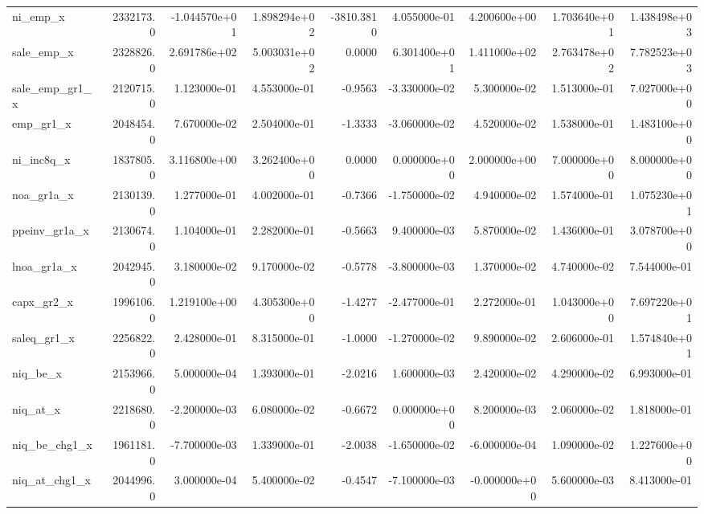 \documentclass[10pt]{article}
\begin{document}
\begin{landscape}
\begin{longtable}{|l|r|r|r|r|r|r|r|r|}
ni\_emp\_x                &  2332173.0 & -1.044570e+01 &  1.898294e+02 &  -3810.3810 &  4.055000e-01 &  4.200600e+00 &  1.703640e+01 &  1.438498e+03 \\
sale\_emp\_x              &  2328826.0 &  2.691786e+02 &  5.003031e+02 &      0.0000 &  6.301400e+01 &  1.411000e+02 &  2.763478e+02 &  7.782523e+03 \\
sale\_emp\_gr1\_x          &  2120715.0 &  1.123000e-01 &  4.553000e-01 &     -0.9563 & -3.330000e-02 &  5.300000e-02 &  1.513000e-01 &  7.027000e+00 \\
emp\_gr1\_x               &  2048454.0 &  7.670000e-02 &  2.504000e-01 &     -1.3333 & -3.060000e-02 &  4.520000e-02 &  1.538000e-01 &  1.483100e+00 \\
ni\_inc8q\_x              &  1837805.0 &  3.116800e+00 &  3.262400e+00 &      0.0000 &  0.000000e+00 &  2.000000e+00 &  7.000000e+00 &  8.000000e+00 \\
noa\_gr1a\_x              &  2130139.0 &  1.277000e-01 &  4.002000e-01 &     -0.7366 & -1.750000e-02 &  4.940000e-02 &  1.574000e-01 &  1.075230e+01 \\
ppeinv\_gr1a\_x           &  2130674.0 &  1.104000e-01 &  2.282000e-01 &     -0.5663 &  9.400000e-03 &  5.870000e-02 &  1.436000e-01 &  3.078700e+00 \\
lnoa\_gr1a\_x             &  2042945.0 &  3.180000e-02 &  9.170000e-02 &     -0.5778 & -3.800000e-03 &  1.370000e-02 &  4.740000e-02 &  7.544000e-01 \\
capx\_gr2\_x              &  1996106.0 &  1.219100e+00 &  4.305300e+00 &     -1.4277 & -2.477000e-01 &  2.272000e-01 &  1.043000e+00 &  7.697220e+01 \\
saleq\_gr1\_x             &  2256822.0 &  2.428000e-01 &  8.315000e-01 &     -1.0000 & -1.270000e-02 &  9.890000e-02 &  2.606000e-01 &  1.574840e+01 \\
niq\_be\_x                &  2153966.0 &  5.000000e-04 &  1.393000e-01 &     -2.0216 &  1.600000e-03 &  2.420000e-02 &  4.290000e-02 &  6.993000e-01 \\
niq\_at\_x                &  2218680.0 & -2.200000e-03 &  6.080000e-02 &     -0.6672 &  0.000000e+00 &  8.200000e-03 &  2.060000e-02 &  1.818000e-01 \\
niq\_be\_chg1\_x           &  1961181.0 & -7.700000e-03 &  1.339000e-01 &     -2.0038 & -1.650000e-02 & -6.000000e-04 &  1.090000e-02 &  1.227600e+00 \\
niq\_at\_chg1\_x           &  2044996.0 &  3.000000e-04 &  5.400000e-02 &     -0.4547 & -7.100000e-03 & -0.000000e+00 &  5.600000e-03 &  8.413000e-01 \\

\end{longtable}
\end{landscape}
\end{document}
